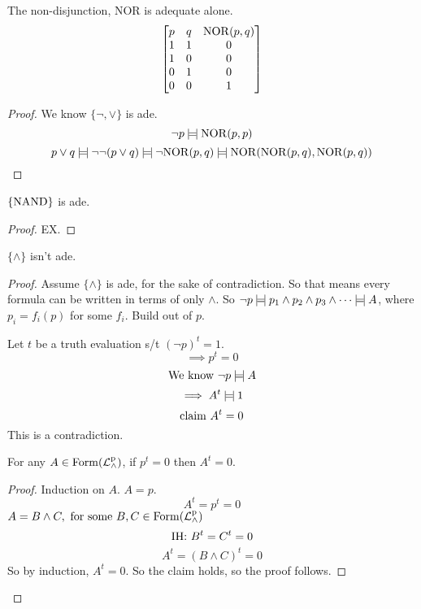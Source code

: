 \documentclass[12pt]{article}
\begin{document}
\bboxnote
\begin{thm}
    The non-disjunction, NOR is adequate alone.
    \[
        \mat{p&q&\TR{NOR}(p,q)\\ 1&1&0\\ 1&0&0\\ 0&1&0\\ 0&0&1}
    \]
\end{thm}
\ebox

\bboxproof
\begin{proof}
    We know \(\{\neg,\lor\}\) is ade.
    \[
        \neg p\logeq\TR{NOR}(p,p)
    \]
    \[
        p\lor q\logeq\neg\neg(p\lor q)\logeq\neg\TR{NOR}(p,q)
        \logeq\TR{NOR}(\TR{NOR}(p,q),\TR{NOR}(p,q))
    \]
\end{proof}
\ebox

\bboxthm
\begin{thm}
    \(\{\TR{NAND}\}\) is ade.
\end{thm}
\ebox

\bboxproof
\begin{proof}
    EX.
\end{proof}
\ebox

\bboxthm
\begin{thm}
    \(\{\wedge\}\) isn't ade.
\end{thm}
\ebox

\bboxproof
\begin{proof}
    Assume \(\{\wedge\}\) is ade, for the sake of contradiction. 
    So that means every formula can be written in terms of only \(\land\).
    So \(\neg p\logeq p_1\land p_2\land p_3\land\cdots\logeq A\), where
    \(p_i=f_i(p)\) for some \(f_i\). Build out of \(p\).

    Let \(t\) be a truth evaluation s/t \((\neg p)^t=1\).
    \[
        \implies p^t=0
    \]
    \[
        \T{We know }\neg p\logeq A
    \]
    \[
        \implies A^t\logeq 1
    \]
    \[
        \T{claim }A^t=0
    \]
    This is a contradiction.

    For any \(A\in\TR{Form}\Lp[\wedge]\), if \(p^t=0\) then \(A^t=0\).

    \bboxproof
    \begin{proof}
        Induction on \(A\).
        \(A=p\).
        \[
            A^t=p^t=0
        \]
        \(A=B\land C,\T{ for some }B,C\in\TR{Form}\Lp[\wedge]\)
        \[
            \T{IH: }B^t=C^t=0
        \]
        \[
            A^t=(B\land C)^t=0
        \]
        So by induction, \(A^t=0\). So the claim holds, so the proof follows.
    \end{proof}
    \ebox

\end{proof}
\ebox


\end{document}
